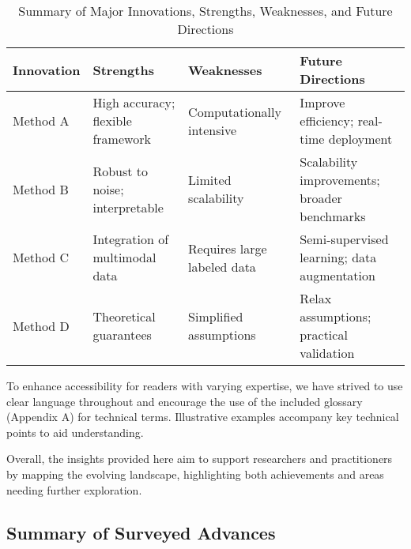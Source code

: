 \documentclass[sigconf]{acmart}
\begin{document}
\begin{table*}[htbp]
\centering
\caption{Summary of Major Innovations, Strengths, Weaknesses, and Future Directions}
\label{tab:summary}
\begin{adjustbox}{max width=\textwidth}
\begin{tabular}{@{}llll@{}}
\toprule
\textbf{Innovation} & \textbf{Strengths} & \textbf{Weaknesses} & \textbf{Future Directions} \\ \midrule
Method A & High accuracy; flexible framework & Computationally intensive & Improve efficiency; real-time deployment \\
Method B & Robust to noise; interpretable & Limited scalability & Scalability improvements; broader benchmarks \\
Method C & Integration of multimodal data & Requires large labeled data & Semi-supervised learning; data augmentation \\
Method D & Theoretical guarantees & Simplified assumptions & Relax assumptions; practical validation \\
\bottomrule
\end{tabular}
\end{adjustbox}
\end{table*}

To enhance accessibility for readers with varying expertise, we have strived to use clear language throughout and encourage the use of the included glossary (Appendix A) for technical terms. Illustrative examples accompany key technical points to aid understanding.

Overall, the insights provided here aim to support researchers and practitioners by mapping the evolving landscape, highlighting both achievements and areas needing further exploration.

\subsection{Summary of Surveyed Advances}
\end{document}
